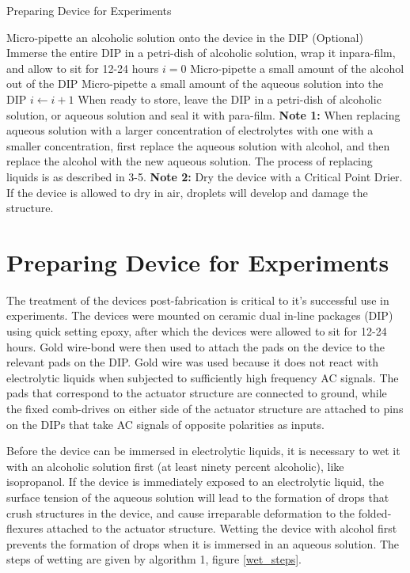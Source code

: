 \begin{algorithm}[H]
\caption{Preparing Device for Experiments}\label{euclid}
\begin{algorithmic}[1]
\State  Micro-pipette an alcoholic solution onto the device in the DIP
\State (Optional) Immerse the entire DIP in a petri-dish of alcoholic solution, wrap it inpara-film, and allow to sit for 12-24 hours
\State $i = 0$
    \State Micro-pipette a small amount of the alcohol out of the DIP
    \State  Micro-pipette a small amount of the aqueous solution into the DIP
    \State $i \leftarrow i+1$
\EndWhile
\State When ready to store, leave the DIP in a petri-dish of alcoholic solution, or aqueous solution and seal it with para-film.
\State \textbf{Note 1:} When replacing aqueous solution with a larger concentration of electrolytes with one with a smaller concentration, first replace the aqueous solution with alcohol, and then replace the alcohol with the new aqueous solution. The process of replacing liquids is as described in 3-5.
\State \textbf{Note 2:} Dry the device with a Critical Point Drier. If the device is allowed to dry in air, droplets will develop and damage the structure. 
\end{algorithmic}
\end{algorithm}

\section{Preparing Device for Experiments}
The treatment of the devices post-fabrication is critical to it's successful use in experiments. The devices were mounted on ceramic dual in-line packages (DIP) using quick setting epoxy, after which the devices were allowed to sit for 12-24 hours. Gold wire-bond were then used to attach the pads on the device to the relevant pads on the DIP. Gold wire was used because it does not react with electrolytic liquids when subjected to sufficiently high frequency AC signals. The pads that correspond to the actuator structure are connected to ground, while the fixed comb-drives on either side of the actuator structure are attached to pins on the DIPs that take AC signals of opposite polarities as inputs. 

Before the device can be immersed in electrolytic liquids, it is necessary to wet it with an alcoholic solution first (at least ninety percent alcoholic), like isopropanol. If the device is immediately exposed to an electrolytic liquid, the surface tension of the aqueous solution will lead to the formation of drops that crush structures in the device, and cause irreparable deformation to the folded-flexures attached to the actuator structure. Wetting the device with alcohol first prevents the formation of drops when it is immersed in an aqueous solution. The steps of wetting are given by algorithm 1, figure \ref{wet_steps}. 

